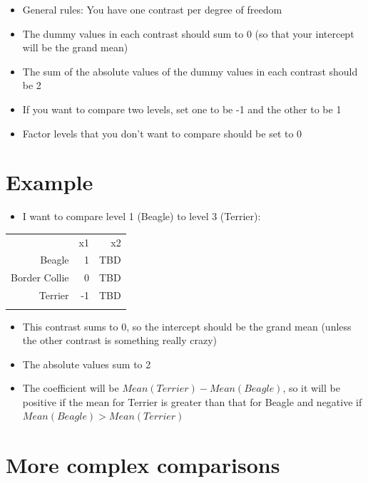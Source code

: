 \documentclass[]{article}
\begin{document}
\begin{itemize}
\itemsep1pt\parskip0pt
\item
  General rules: You have one contrast per degree of freedom
\item
  The dummy values in each contrast should sum to 0 (so that your
  intercept will be the grand mean)
\item
  The sum of the absolute values of the dummy values in each contrast
  should be 2
\item
  If you want to compare two levels, set one to be -1 and the other to
  be 1
\item
  Factor levels that you don't want to compare should be set to 0
\end{itemize}

\section{Example}\label{example-1}

\begin{itemize}
\itemsep1pt\parskip0pt
\item
  I want to compare level 1 (Beagle) to level 3 (Terrier):
\end{itemize}

\begin{longtable}[c]{@{}rrr@{}}
\toprule\addlinespace
& x1 & x2
\\\addlinespace
\midrule\endhead
Beagle & 1 & TBD
\\\addlinespace
Border Collie & 0 & TBD
\\\addlinespace
Terrier & -1 & TBD
\\\addlinespace
\bottomrule
\end{longtable}

\begin{itemize}
\itemsep1pt\parskip0pt
\item
  This contrast sums to 0, so the intercept should be the grand mean
  (unless the other contrast is something really crazy)
\item
  The absolute values sum to 2
\item
  The coefficient will be $Mean(Terrier) - Mean(Beagle)$, so it will be
  positive if the mean for Terrier is greater than that for Beagle and
  negative if $Mean(Beagle) > Mean(Terrier)$
\end{itemize}

\section{More complex comparisons}\label{more-complex-comparisons}
\end{document}
